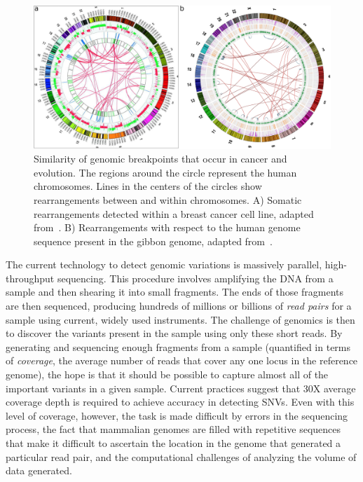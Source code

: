 \begin{figure}
\centering
\includegraphics[width=.9\textwidth]{figures/breakpoints_in_cancer_and_evolution.pdf}
\caption{Similarity of genomic breakpoints that occur in cancer and evolution. The regions around the circle represent the human chromosomes. Lines in the centers of the circles show rearrangements between and within chromosomes. A) Somatic rearrangements detected within a breast cancer cell line, adapted from~\cite{Hampton:2009fc}. B) Rearrangements with respect to the human genome sequence present in the gibbon genome, adapted from~\cite{Carbone:2009p1012}.}
\label{cancer_evolution_breakpoints}
\end{figure}

The current technology to detect genomic variations is massively parallel, high-throughput sequencing. This procedure involves amplifying the DNA from a sample and then shearing it into small fragments. The ends of those fragments are then sequenced, producing hundreds of millions or billions of \emph{read pairs} for a sample using current, widely used instruments. The challenge of genomics is then to discover the variants present in the sample using only these short reads. By generating and sequencing enough fragments from a sample (quantified in terms of \emph{coverage}, the average number of reads that cover any one locus in the reference genome), the hope is that it should be possible to capture almost all of the important variants in a given sample. Current practices suggest that 30X average coverage depth is required to achieve accuracy in detecting SNVs. Even with this level of coverage, however, the task is made difficult by errors in the sequencing process, the fact that mammalian genomes are filled with repetitive sequences that make it difficult to ascertain the location in the genome that generated a particular read pair, and the computational challenges of analyzing the volume of data generated.

